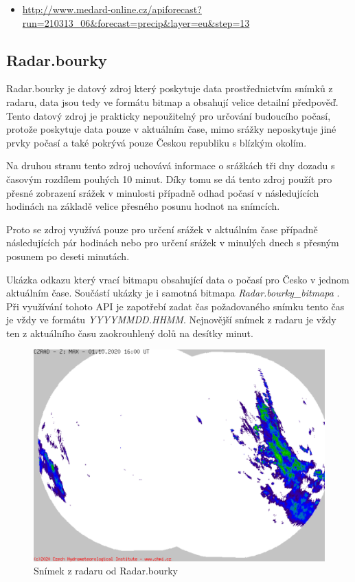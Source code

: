 \documentclass[czech,bachelor,dept460,male,csharp,cpdeclaration]{diploma}
\begin{document}
	\begin{itemize}
		\item \url{http://www.medard-online.cz/apiforecast?run=210313\_06\&forecast=precip\&layer=eu\&step=13}
	\end{itemize}
	
	\subsection{Radar.bourky}
	
	Radar.bourky \cite{chmi} je datový zdroj který poskytuje data prostřednictvím snímků z radaru, data jsou tedy ve formátu bitmap a obsahují velice detailní předpověď. Tento datový zdroj je prakticky nepoužitelný pro určování budoucího počasí, protože poskytuje data pouze v aktuálním čase, mimo srážky neposkytuje jiné prvky počasí a také pokrývá pouze Českou republiku s blízkým okolím.
	
	Na druhou stranu tento zdroj uchovává informace o srážkách tři dny dozadu s časovým rozdílem pouhých 10 minut. Díky tomu se dá tento zdroj použít pro přesné zobrazení srážek v minulosti případně odhad počasí v následujících hodinách na základě velice přesného posunu hodnot na snímcích.
	
	Proto se zdroj využívá pouze pro určení srážek v aktuálním čase případně následujících pár hodinách nebo pro určení srážek v minulých dnech s přesným posunem po deseti minutách.
	
	Ukázka odkazu který vrací bitmapu obsahující data o počasí pro Česko v jednom aktuálním čase. Součástí ukázky je i samotná bitmapa \emph{Radar.bourky\_bitmapa} \cite{chmi}. Při využívání tohoto API je zapotřebí zadat čas požadovaného snímku tento čas je vždy ve formátu {\it YYYYMMDD.HHMM}. Nejnovější snímek z radaru je vždy ten z aktuálního času zaokrouhlený dolů na desítky minut.
	
	\begin{figure}[b!]
		\centering
		\includegraphics[scale=0.4]{Data/Rb_ukazka.png}
		\caption{Snímek z radaru od Radar.bourky \cite{chmi}}
	\end{figure}
	
\end{document}
